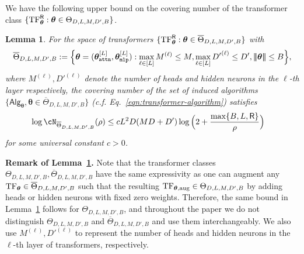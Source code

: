 \documentclass[10pt]{article}
\newtheorem{lemma}[theorem]{Lemma}
\renewcommand{\bar}{\overline}
\newcommand{\<}{\left\langle}
\renewcommand{\>}{\right\rangle}
\newcommand{\lth}{{(\ell)}}
\newcommand{\TF}{{\rm TF}}
\newcommand{\nrmp}[1]{{\left|\!\left|\!\left|{#1}\right|\!\right|\!\right|}}
\newcommand{\mlp}{{\tt mlp}}
\newcommand{\attn}{{\tt attn}}
\newcommand{\sAlg}{{\mathsf{Alg}}}
\newcommand{\tfpar}{{\btheta}}
\newcommand{\tfparspace}{{\Theta}}
\newcommand{\layer}{{L}}
\newcommand{\hidden}{{D'}}
\newcommand{\head}{{M}}
\newcommand{\normb}{{B}}
\newcommand{\clipval}{{\mathsf{R}}}
\newcommand{\embd}{{D}}  %
\def\btheta{{\boldsymbol \theta}}
\def\bh{{\mathbf h}}
\newcommand{\authnote}[2]{{\scriptsize $\ll$\textsf{#1 notes: #2}$\gg$}}
\newcommand{\authnote}[2]{}
\newcommand{\yub}[1]{{\color{red}\authnote{Yu}{#1}}}
\newcommand{\lc}[1]{{\color{blue}\authnote{Licong}{#1}}}
\begin{document}
We have the following upper bound on the covering number of the transformer class $\{\TF^\clipval_{\tfpar}:\tfpar\in\tfparspace_{D, \layer,\head,\hidden,\normb}\}$.  %
\begin{lemma}\label{lm:cover_num_bound}
For the space of transformers $\{\TF^\clipval_{\tfpar}:\tfpar\in\bar{\tfparspace}_{D, \layer,\head,\hidden,\normb}\}$ with 
\begin{align*}
\bar{\tfparspace}_{D, \layer,\head,\hidden,\normb}:= \Big\{\tfpar=(\tfpar^{[\layer]}_\attn,\tfpar^{[\layer]}_\mlp):\max_{\ell\in[\layer]}\head^\lth\leq \head, \max_{\ell\in[\layer]}\hidden^\lth\leq \hidden, \nrmp{\tfpar}\leq\normb \Big\}, 
\end{align*}where $\head^\lth,\hidden^\lth$ denote the number  of heads and hidden neurons in the $\ell$-th layer respectively, the covering number of the set of induced algorithms $\{\sAlg_\tfpar,\tfpar\in\bar{\tfparspace}_{D, \layer,\head,\hidden,\normb}\}$ (c.f. Eq.~\ref{eqn:transformer-algorithm}) satisfies
\begin{align*}
    \log \cN_{\bar{\tfparspace}_{D, \layer,\head,\hidden,\normb}}(\rho)
    &\leq c\layer^2\embd(\head\embd+\hidden)\log\Big(2+\frac{\max\{\normb,\layer,\clipval\}}{\rho}\Big)
\end{align*} for some universal constant $c>0$. 


\end{lemma}
\textbf{Remark of Lemma~\ref{lm:cover_num_bound}.} Note that the transformer classes ${\tfparspace}_{D, \layer,\head,\hidden,\normb},\bar{\tfparspace}_{D, \layer,\head,\hidden,\normb}$ have the same expressivity as one can augment any $\TF_\tfpar\in \bar{\tfparspace}_{D, \layer,\head,\hidden,\normb}$ such that the resulting $\TF_{\tfpar,\mathrm{aug}}\in{\tfparspace}_{D, \layer,\head,\hidden,\normb}$ by adding heads or hidden neurons with fixed zero weights. Therefore, the same bound in Lemma~\ref{lm:cover_num_bound} follows for ${\tfparspace}_{D, \layer,\head,\hidden,\normb}$, and  throughout the paper we do not distinguish ${\tfparspace}_{D, \layer,\head,\hidden,\normb}$ and $\bar{\tfparspace}_{D, \layer,\head,\hidden,\normb}$ and use them interchangeably. We also use $\head^\lth,\hidden^\lth$ to  represent the number  of heads and hidden neurons in the $\ell$-th layer of transformers, respectively. 
\end{document}
